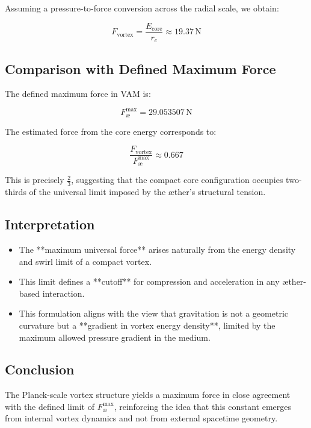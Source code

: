 Assuming a pressure-to-force conversion across the radial scale, we obtain:

\begin{equation}
F_{\text{vortex}} = \frac{E_{\text{core}}}{r_c} \approx 19.37 \, \text{N}
\end{equation}

\subsection{Comparison with Defined Maximum Force}

The defined maximum force in VAM is:

\[
F_\text{\ae}^\text{max} = 29.053507 \, \text{N}
\]

The estimated force from the core energy corresponds to:

\[
\frac{F_{\text{vortex}}}{F_\text{\ae}^\text{max}} \approx 0.667
\]

This is precisely \(\frac{2}{3}\), suggesting that the compact core configuration occupies two-thirds of the universal limit imposed by the æther's structural tension.

\subsection{Interpretation}

\begin{itemize}
    \item The **maximum universal force** arises naturally from the energy density and swirl limit of a compact vortex.
    \item This limit defines a **cutoff** for compression and acceleration in any æther-based interaction.
    \item This formulation aligns with the view that gravitation is not a geometric curvature but a **gradient in vortex energy density**, limited by the maximum allowed pressure gradient in the medium.
\end{itemize}

\subsection{Conclusion}

The Planck-scale vortex structure yields a maximum force in close agreement with the defined limit of \( F_\text{\ae}^\text{max} \), reinforcing the idea that this constant emerges from internal vortex dynamics and not from external spacetime geometry.
